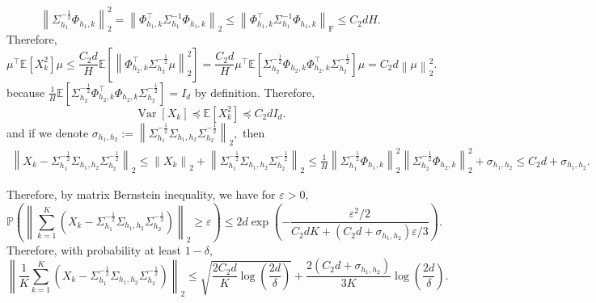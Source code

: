 \documentclass{article}
\numberwithin{equation}{section}
\theoremstyle{plain}
\theoremstyle{definition}
\theoremstyle{remark}
\begin{document}
\begin{equation*}
    \left\|\Sigma_{h_1}^{-\frac{1}{2}} \Phi_{h_1,k} \right\|_2^2 = \left\|\Phi_{h_1,k}^{\top} \Sigma_{h_1}^{-1} \Phi_{h_1,k}\right\|_2 \leq \left\|\Phi_{h_1,k}^{\top} \Sigma_{h_1}^{-1} \Phi_{h_1,k}\right\|_{\operatorname{F}} \leq C_2 d H.
\end{equation*}
Therefore,
\begin{equation*}
    \mu^{\top}\mathbb{E}\left[X_k^2\right] \mu 
    \leq \frac{C_2 d}{H} \mathbb{E}\left[\left\|\Phi_{h_2,k}^{\top} \Sigma_{h_2}^{-\frac{1}{2}} \mu \right\|_2^2\right] = \frac{C_2 d}{H} \mu^{\top} \mathbb{E} \left[\Sigma_{h_2}^{-\frac{1}{2}} \Phi_{h_2,k} \Phi_{h_2,k}^{\top} \Sigma_{h_2}^{-\frac{1}{2}}\right] \mu = C_2 d \left\|\mu\right\|_2^2.
\end{equation*}
because $\frac{1}{H}\mathbb{E} \left[\Sigma_{h_2}^{-\frac{1}{2}} \Phi_{h_2,k}^{\top} \Phi_{h_2,k} \Sigma_{h_2}^{-\frac{1}{2}}\right] = I_d$ by definition. Therefore,
\begin{equation*}
    \operatorname{Var}\left[X_k\right] \preceq \mathbb{E}\left[X_k^2\right] \preceq C_2d I_d.
\end{equation*}
and if we denote $\sigma_{h_1,h_2} := \left\|\Sigma_{h_1}^{-\frac{1}{2}} \Sigma_{h_1,h_2} \Sigma_{h_2}^{-\frac{1}{2}}\right\|_2,$ then
\begin{align*}
    \left\|X_k - \Sigma_{h_1}^{-\frac{1}{2}} \Sigma_{h_1,h_2} \Sigma_{h_2}^{-\frac{1}{2}}\right\|_2 \leq \left\|X_k\right\|_2 + \left\|\Sigma_{h_1}^{-\frac{1}{2}} \Sigma_{h_1,h_2} \Sigma_{h_2}^{-\frac{1}{2}}\right\|_2 \leq \frac{1}{H} \left\|\Sigma_{h_1}^{-\frac{1}{2}} \Phi_{h_1,k} \right\|_2^2 \left\|\Sigma_{h_2}^{-\frac{1}{2}} \Phi_{h_2,k} \right\|_2^2 + \sigma_{h_1,h_2}\leq C_2 d + \sigma_{h_1,h_2}.
\end{align*}

Therefore, by matrix Bernstein inequality, we have for $\varepsilon > 0,$
\begin{equation*}
    \mathbb{P}\left(\left\|\sum_{k=1}^K\left(X_k - \Sigma_{h_1}^{-\frac{1}{2}} \Sigma_{h_1,h_2} \Sigma_{h_2}^{-\frac{1}{2}} \right)\right\|_2 \geq \varepsilon\right) \leq 2d \exp\left(-\frac{\varepsilon^2/2}{C_2d K + \left(C_2d+\sigma_{h_1,h_2}\right)\varepsilon/3}\right).
\end{equation*}
Therefore, with probability at least $1 - \delta,$
\begin{equation*}
    \left\|\frac{1}{K}\sum_{k=1}^K\left(X_k - \Sigma_{h_1}^{-\frac{1}{2}} \Sigma_{h_1,h_2} \Sigma_{h_2}^{-\frac{1}{2}} \right)\right\|_2 \leq \sqrt{\frac{2C_2 d}{K}\log\left(\frac{2d}{\delta}\right)} + \frac{2\left(C_2d+\sigma_{h_1,h_2}\right)}{3 K}\log\left(\frac{2d}{\delta}\right).
\end{equation*}
\end{document}
